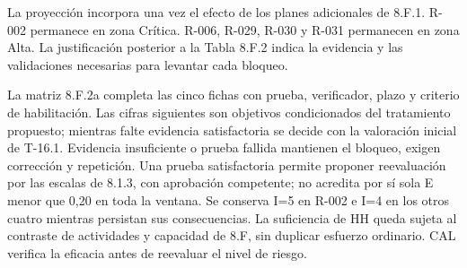 \documentclass[carta,firma,sinnotas]{lafrox}
\begin{document}
\begin{landscape}
\endgroup
\end{landscape}


\begingroup
\renewcommand{\thetable}{T-16.2}
\begin{landscape}
\setlength{\textwidth}{\linewidth}
\renewcommand{\arraystretch}{1.08}
La proyección incorpora una vez el efecto de los planes adicionales de 8.F.1. R-002 permanece en zona Crítica. R-006, R-029, R-030 y R-031 permanecen en zona Alta. La justificación posterior a la Tabla 8.F.2 indica la evidencia y las validaciones necesarias para levantar cada bloqueo.

La matriz 8.F.2a completa las cinco fichas con prueba, verificador, plazo y criterio
de habilitación. Las cifras siguientes son objetivos condicionados del tratamiento
propuesto; mientras falte evidencia satisfactoria se decide con la valoración
inicial de T-16.1. Evidencia insuficiente o prueba fallida mantienen el bloqueo,
exigen corrección y repetición. Una prueba satisfactoria permite proponer
reevaluación por las escalas de 8.1.3, con aprobación competente; no acredita por
sí sola E menor que 0,20 en toda la ventana. Se conserva I=5 en R-002 e I=4 en los
otros cuatro mientras persistan sus consecuencias. La suficiencia de HH queda
sujeta al contraste de actividades y capacidad de 8.F, sin duplicar esfuerzo
ordinario. CAL verifica la eficacia antes de reevaluar el nivel de riesgo.


\end{landscape}
\end{document}
